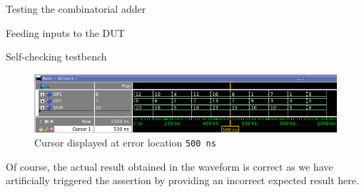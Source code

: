 \documentclass[lab]{course}
\begin{document}
\begin{section}{Testing the combinatorial adder}
\begin{subsection}{Feeding inputs to the DUT}
\begin{subsubsection}{Self-checking testbench}
            \begin{figure}[!h]
                \begin{centering}
                    \includegraphics[width=1.0\textwidth]{figs/waveform_combinatorial_assertion_failure_cursor.png}
                    \caption{Cursor displayed at error location \texttt{500 ns}}
                    \label{fig:waveform_combinatorial_assertion_failure_cursor}
                \end{centering}
            \end{figure}

            Of course, the actual result obtained in the waveform is correct as we have artificially triggered the assertion by providing an incorrect expected result here.

        \end{subsubsection}
    \end{subsection}
\end{section}

\clearpage
\end{document}
